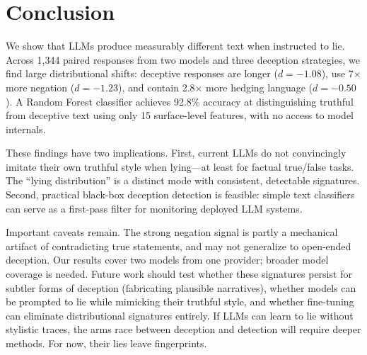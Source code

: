 \section{Conclusion}
\label{sec:conclusion}

We show that LLMs produce measurably different text when instructed to lie. Across 1,344 paired responses from two models and three deception strategies, we find large distributional shifts: deceptive responses are longer ($d = -1.08$), use 7$\times$ more negation ($d = -1.23$), and contain 2.8$\times$ more hedging language ($d = -0.50$). A Random Forest classifier achieves 92.8\% accuracy at distinguishing truthful from deceptive text using only 15 surface-level features, with no access to model internals.

These findings have two implications. First, current LLMs do not convincingly imitate their own truthful style when lying---at least for factual true/false tasks. The ``lying distribution'' is a distinct mode with consistent, detectable signatures. Second, practical black-box deception detection is feasible: simple text classifiers can serve as a first-pass filter for monitoring deployed LLM systems.

Important caveats remain. The strong negation signal is partly a mechanical artifact of contradicting true statements, and may not generalize to open-ended deception. Our results cover two models from one provider; broader model coverage is needed. Future work should test whether these signatures persist for subtler forms of deception (\eg fabricating plausible narratives), whether models can be prompted to lie while mimicking their truthful style, and whether fine-tuning can eliminate distributional signatures entirely. If LLMs can learn to lie without stylistic traces, the arms race between deception and detection will require deeper methods. For now, their lies leave fingerprints.
